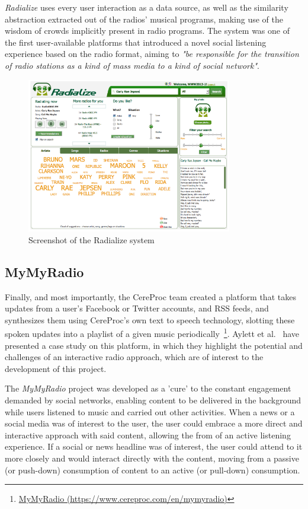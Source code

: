 \textit{Radialize} uses every user interaction as a data source, as well as the similarity abstraction extracted out of the radios’ musical programs, making use of the wisdom of crowds implicitly present in radio programs. The system was one of the first user-available platforms that introduced a novel social listening experience based on the radio format, aiming to \textit{"be responsible for the transition of radio stations as a kind of mass media to a kind of social network"}.~\cite{Pereira2013}


\begin{figure}[h]
\centering
\includegraphics[width=0.8\textwidth]{./Images/radialize.png}
\caption{Screenshot of the Radialize system}
\label{fig:test_env}
\end{figure}

\subsection{MyMyRadio}

Finally, and most importantly, the CereProc team created a platform that takes updates from a user's Facebook or Twitter accounts, and RSS feeds, and synthesizes them using CereProc's own text to speech technology, slotting these spoken updates into a playlist of a given music periodically~\footnote{\href{https://www.cereproc.com/en/mymyradio}{MyMyRadio (https://www.cereproc.com/en/mymyradio)}}. Aylett et al.~\cite{Aylett2015} have presented a case study on this platform, in which they highlight the potential and challenges of an interactive radio approach, which are of interest to the development of this project.

The \textit{MyMyRadio} project was developed as a 'cure' to the constant engagement demanded by social networks, enabling content to be delivered in the background while users listened to music and carried out other activities. When a news or a social media was of interest to the user, the user could embrace a more direct and interactive approach with said content, allowing the from of an active listening experience. If a social or news headline was of interest, the user could attend to it more closely and would interact directly with the content, moving from a passive (or push-down) consumption of content to an active (or pull-down) consumption.


